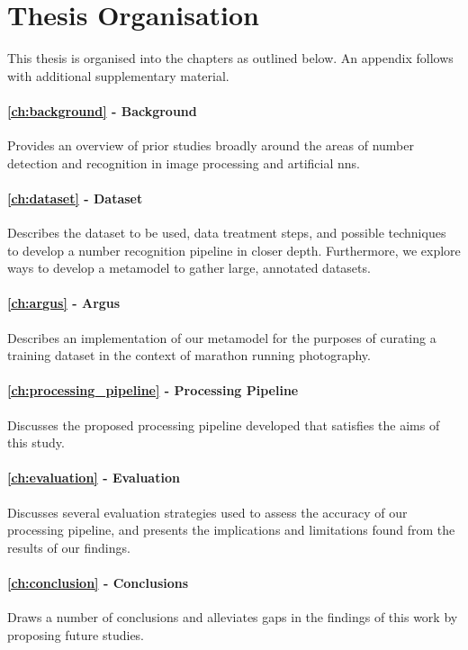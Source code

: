 \section{Thesis Organisation}
\label{sec:introduction:organisation}

This thesis is organised into the chapters as outlined below. An appendix follows with additional supplementary material.

\paragraph{\cref{ch:background} - Background} Provides an overview of prior studies broadly around the areas of number detection and recognition in image processing and artificial \glspl{nn}.

\paragraph{\cref{ch:dataset} - Dataset} Describes the dataset to be used, data treatment steps, and possible techniques to develop a number recognition pipeline in closer depth. Furthermore, we explore ways to develop a metamodel to gather large, annotated datasets.

\paragraph{\cref{ch:argus} - Argus} Describes an implementation of our metamodel for the purposes of curating a training dataset in the context of marathon running photography.

\paragraph{\cref{ch:processing_pipeline} - Processing Pipeline} Discusses the proposed processing pipeline developed that satisfies the aims of this study.

\paragraph{\cref{ch:evaluation} - Evaluation} Discusses several evaluation strategies used to assess the accuracy of our processing pipeline, and presents the implications and limitations found from the results of our findings.

\paragraph{\cref{ch:conclusion} - Conclusions} Draws a number of conclusions and alleviates gaps in the findings of this work by proposing future studies.